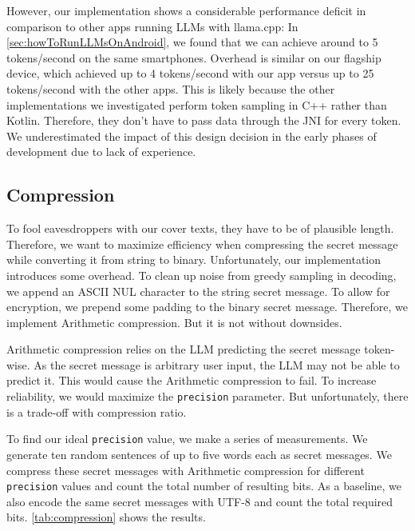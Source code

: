 However, our implementation shows a considerable performance deficit in comparison to other apps running \glspl{LLM} with llama.cpp: In \cref{sec:howToRunLLMsOnAndroid}, we found that we can achieve around to 5 tokens/second on the same smartphones. Overhead is similar on our flagship device, which achieved up to 4 tokens/second with our app versus up to 25 tokens/second with the other apps. This is likely because the other implementations we investigated perform token sampling in C++ rather than Kotlin. Therefore, they don't have to pass data through the \gls{JNI} for every token. We underestimated the impact of this design decision in the early phases of development due to lack of experience.

\subsection{Compression}
\label{sec:compression}
To fool eavesdroppers with our cover texts, they have to be of plausible length. Therefore, we want to maximize efficiency when compressing the secret message while converting it from string to binary. Unfortunately, our implementation introduces some overhead. To clean up noise from greedy sampling in decoding, we append an ASCII NUL character to the string secret message. To allow for encryption, we prepend some padding to the binary secret message. Therefore, we implement Arithmetic compression. But it is not without downsides.

Arithmetic compression relies on the \gls{LLM} predicting the secret message token-wise. As the secret message is arbitrary user input, the \gls{LLM} may not be able to predict it. This would cause the Arithmetic compression to fail. To increase reliability, we would maximize the \lstinline|precision| parameter. But unfortunately, there is a trade-off with compression ratio.

To find our ideal \lstinline|precision| value, we make a series of measurements. We generate ten random sentences of up to five words each as secret messages. We compress these secret messages with Arithmetic compression for different \lstinline|precision| values and count the total number of resulting bits. As a baseline, we also encode the same secret messages with UTF-8 and count the total required bits. \cref{tab:compression} shows the results.

